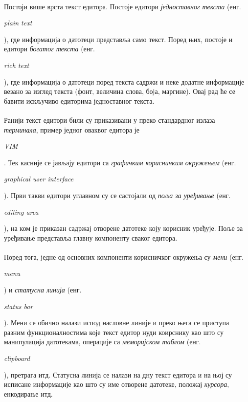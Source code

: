\documentclass[12pt,oneside]{memoir}
\begin{document}
\paragraph{}
Постоји више врста текст едитора. Постоје едитори \emph{једноставног текста}
(енг. \begin{latinica}\textit{plain text}\end{latinica}), где информација
о датотеци представља само текст. Поред њих, постоје и едитори \emph{богатог текста}
(енг. \begin{latinica}\textit{rich text}\end{latinica}), где информација о датотеци
поред текста садржи и неке додатне информације везано за изглед текста (фонт, величина слова, боја, маргине). Овај рад ће се бавити искључиво
едиторима једноставног текста.

\paragraph{}
Ранији текст едитори били су приказивани у преко стандардног излаза \emph{терминала}, 
пример једног оваквог едитора је \begin{latinica}\textit{VIM}\end{latinica} \cite{VIM}. 
Тек касније се јављају едитори са \emph{графичким корисничким окружењем} 
(енг. \begin{latinica}\textit{graphical user interface}\end{latinica}). Први
такви едитори углавном су се састојали од \emph{поља за уређивање} 
(енг. \begin{latinica}\textit{editing area}\end{latinica}), на ком је
приказан садржај отворене датотеке коју корисник уређује. Поље за уређивање
представља главну компоненту сваког едитора. 

\paragraph{}
Поред тога, једне од основних компоненти
корисничког окружења су \emph{мени} (енг. \begin{latinica}\textit{menu}\end{latinica}) и
\emph{статусна линија} (енг. \begin{latinica}\textit{status bar}\end{latinica}). 
Мени се обично налази испод насловне линије и преко њега се приступа разним
функционалностима које текст едитор нуди коирснику као што су манипулација датотекама,
операције са \emph{меморијском таблом} 
(енг. \begin{latinica}\textit{clipboard}\end{latinica}),
претрага итд. Статусна линија се налази на дну текст едитора и на њој су исписане
информације као што су име отворене датотеке, положај \emph{курсора}, енкодирање итд.
\end{document}
